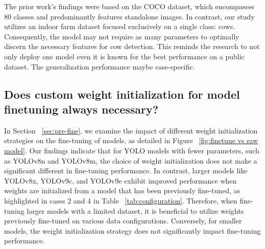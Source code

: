 The prior work's findings were based on the COCO dataset, which encompasses 80 classes and predominantly features standalone images. In contrast, our study utilizes an indoor farm dataset focused exclusively on a single class: cows. Consequently, the model may not require as many parameters to optimally discern the necessary features for cow detection. This reminds the research to not only deploy one model even it is known for the best performance on a public dataset. The generalization performance maybe case-specific.

\subsection{Does custom weight initialization for model finetuning always necessary?}

In Section ~\ref{sec:pre-fine}, we examine the impact of different weight initialization strategies on the fine-tuning of models, as detailed in Figure ~\ref{fig:finetune vs raw model}. Our findings indicate that for YOLO models with fewer parameters, such as YOLOv8n and YOLOv8m, the choice of weight initialization does not make a significant different in fine-tuning performance. In contrast, larger models like YOLOv8x, YOLOv9c, and YOLOv9e exhibit improved performance when weights are initialized from a model that has been previously fine-tuned, as highlighted in cases 2 and 4 in Table ~\ref{tab:configuration}. Therefore, when fine-tuning larger models with a limited dataset, it is beneficial to utilize weights previously fine-tuned on various data configurations. Conversely, for smaller models, the weight initialization strategy does not significantly impact fine-tuning performance.





